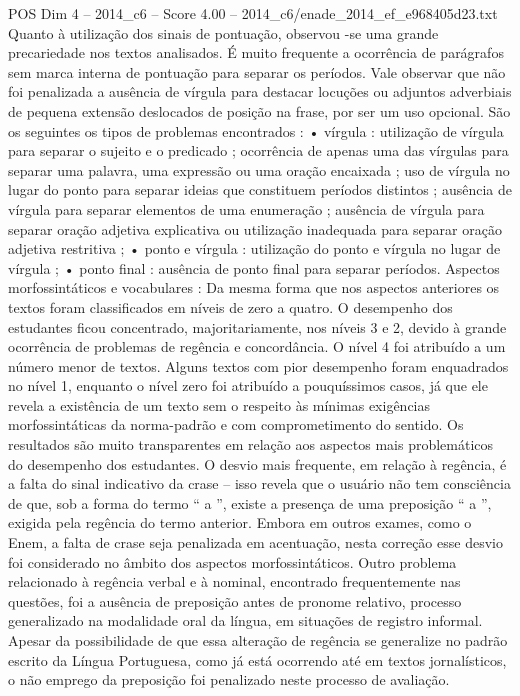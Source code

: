 \begin{textsample}{POS Dim 4 – 2014\_c6 – Score 4.00 – 2014\_c6/enade\_2014\_ef\_e968405d23.txt}
Quanto à utilização dos sinais de pontuação, observou -se uma grande precariedade nos textos analisados.
É muito frequente a ocorrência de parágrafos sem marca interna de pontuação para separar os períodos.
Vale observar que não foi penalizada a ausência de vírgula para destacar locuções ou adjuntos adverbiais de pequena extensão deslocados de posição na frase, por ser um uso opcional.
São os seguintes os tipos de problemas encontrados : • vírgula : utilização de vírgula para separar o sujeito e o predicado ; ocorrência de apenas uma das vírgulas para separar uma palavra, uma expressão ou uma oração encaixada ; uso de vírgula no lugar do ponto para separar ideias que constituem períodos distintos ; ausência de vírgula para separar elementos de uma enumeração ; ausência de vírgula para separar oração adjetiva explicativa ou utilização inadequada para separar oração adjetiva restritiva ; • ponto e vírgula : utilização do ponto e vírgula no lugar de vírgula ; • ponto final : ausência de ponto final para separar períodos.
Aspectos morfossintáticos e vocabulares : Da mesma forma que nos aspectos anteriores os textos foram classificados em níveis de zero a quatro.
O desempenho dos estudantes ficou concentrado, majoritariamente, nos níveis 3 e 2, devido à grande ocorrência de problemas de regência e concordância.
O nível 4 foi atribuído a um número menor de textos.
Alguns textos com pior desempenho foram enquadrados no nível 1, enquanto o nível zero foi atribuído a pouquíssimos casos, já que ele revela a existência de um texto sem o respeito às mínimas exigências morfossintáticas da norma-padrão e com comprometimento do sentido.
Os resultados são muito transparentes em relação aos aspectos mais problemáticos do desempenho dos estudantes.
O desvio mais frequente, em relação à regência, é a falta do sinal indicativo da crase – isso revela que o usuário não tem consciência de que, sob a forma do termo “ a ”, existe a presença de uma preposição “ a ”, exigida pela regência do termo anterior.
Embora em outros exames, como o Enem, a falta de crase seja penalizada em acentuação, nesta correção esse desvio foi considerado no âmbito dos aspectos morfossintáticos.
Outro problema relacionado à regência verbal e à nominal, encontrado frequentemente nas questões, foi a ausência de preposição antes de pronome relativo, processo generalizado na modalidade oral da língua, em situações de registro informal.
Apesar da possibilidade de que essa alteração de regência se generalize no padrão escrito da Língua Portuguesa, como já está ocorrendo até em textos jornalísticos, o não emprego da preposição foi penalizado neste processo de avaliação.

\end{textsample}
